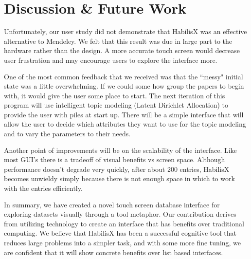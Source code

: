 \documentclass{article}
\begin{document}
\section{Discussion \& Future Work}
Unfortunately, our user study did not demonstrate that HabilisX was an effective alternative to Mendeley.  We felt that this result was due in large part to the hardware rather than the design.  A more accurate touch screen would decrease user frustration and may encourage users to explore the interface more.  

One of the most common feedback that we received was that the ``messy" initial state was a little overwhelming.  If we could some how group the papers to begin with, it would give the user some place to start.  The next iteration of this program will use intelligent topic modeling (Latent Dirichlet Allocation) to provide the user with piles at start up.  There will be a simple interface that will allow the user to decide which attributes they want to use for the topic modeling and to vary the parameters to their needs.  

Another point of improvements will be on the scalability of the interface.  Like most GUI's there is a tradeoff of visual benefits vs screen space.  Although performance doesn't degrade very quickly, after about 200 entries, HabilisX becomes unwieldy simply because there is not enough space in which to work with the entries efficiently.  

In summary, we have created a novel touch screen database interface for exploring datasets visually through a tool metaphor.  Our contribution derives from utilizing technology to create an interface that has benefits over traditional computing.  We believe that HabilisX has been a successful cognitive tool that reduces large problems into a simpler task, and with some more fine tuning, we are confident that it will show concrete benefits over list based interfaces.  





%
{}
\end{document}
